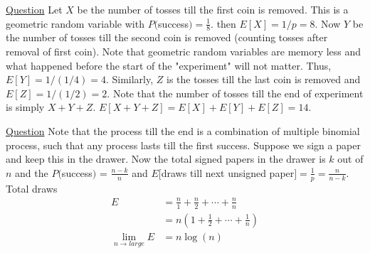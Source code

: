 \documentclass[../probability-notes.tex]{subfiles}
\begin{document}
\begin{enumerate}
\begin{enumerate}
        \end{enumerate}


        \hypertarget{a_linexp}{\item} \hyperlink{q_linexp}{Question}\newline
        Let $X$ be the number of tosses till the first coin is removed. This is a geometric random variable with $P($success$) = \frac{1}{8}$. then $E[X] = 1/p = 8$. Now $Y$ be the number of tosses till the second coin is removed (counting tosses after removal of first coin). Note that geometric random variables are memory less and what happened before the start of the "experiment" will not matter. Thus, $E[Y] = 1/(1/4) = 4$. Similarly, $Z$ is the tosses till the last coin is removed and $E[Z] = 1/(1/2) = 2$. Note that the number of tosses till the end of experiment is simply $X + Y + Z$. $E[X+Y+Z] = E[X] + E[Y] + E[Z] = 14$.


        \hypertarget{a_papers}{\item} \hyperlink{q_papers}{Question}\newline
        Note that the process till the end is a combination of multiple binomial process, such that any process lasts till the first success. Suppose we sign a paper and keep this in the drawer. Now the total signed papers in the drawer is $k$ out of $n$ and the $P($success$)$ = $\frac{n-k}{n}$ and $E[$draws till next unsigned paper$] = \frac{1}{p} = \frac{n}{n-k}$. Total draws
        \begin{align*}
            E &= \frac{n}{1} + \frac{n}{2} + \cdots + \frac{n}{n}\\
             &= n(1 + \frac{1}{2} + \cdots + \frac{1}{n})\\
            \lim_{n \to large} E &= n \log(n) 
        \end{align*}



\end{enumerate}
\end{document}
